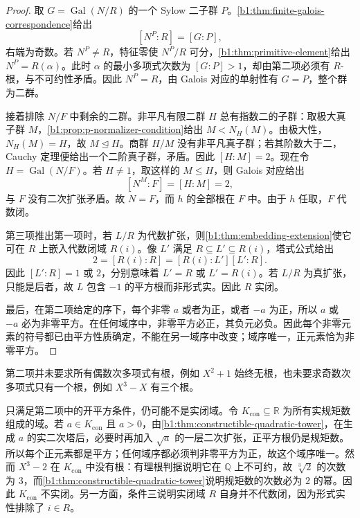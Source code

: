 \begin{proof}
	取 \(G=\operatorname{Gal}(N/R)\) 的一个 Sylow 二子群 \(P\)。\cref{b1:thm:finite-galois-correspondence}给出
	\[
		[N^P:R]=[G:P],
	\]
	右端为奇数。若 \(N^P\ne R\)，特征零使 \(N^P/R\) 可分，\cref{b1:thm:primitive-element}给出 \(N^P=R(\alpha)\)。此时 \(\alpha\) 的最小多项式次数为 \([G:P]>1\)，却由第二项必须有 \(R\)-根，与不可约性矛盾。因此 \(N^P=R\)，由 Galois 对应的单射性有 \(G=P\)，整个群为二群。

	接着排除 \(N/F\) 中剩余的二群。非平凡有限二群 \(H\) 总有指数二的子群：取极大真子群 \(M\)，\cref{b1:prop:p-normalizer-condition}给出 \(M<N_H(M)\)。由极大性，\(N_H(M)=H\)，故 \(M\trianglelefteq H\)。商群 \(H/M\) 没有非平凡真子群；若其阶数大于二，Cauchy 定理便给出一个二阶真子群，矛盾。因此 \([H:M]=2\)。现在令 \(H=\operatorname{Gal}(N/F)\)。若 \(H\ne1\)，取这样的 \(M\le H\)，则 Galois 对应给出
	\[
		[N^M:F]=[H:M]=2,
	\]
	与 \(F\) 没有二次扩张矛盾。故 \(N=F\)，而 \(h\) 的全部根在 \(F\) 中。由于 \(h\) 任取，\(F\) 代数闭。

	第三项推出第一项时，若 \(L/R\) 为代数扩张，则\cref{b1:thm:embedding-extension}使它可在 \(R\) 上嵌入代数闭域 \(R(i)\)。像 \(L'\) 满足 \(R\subseteq L'\subseteq R(i)\)，塔式公式给出
	\[
		2=[R(i):R]=[R(i):L'][L':R].
	\]
	因此 \([L':R]=1\) 或 \(2\)，分别意味着 \(L'=R\) 或 \(L'=R(i)\)。若 \(L/R\) 为真扩张，只能是后者，故 \(L\) 包含 \(-1\) 的平方根而非形式实。因此 \(R\) 实闭。

	最后，在第二项给定的序下，每个非零 \(a\) 或者为正，或者 \(-a\) 为正，所以 \(a\) 或 \(-a\) 必为非零平方。在任何域序中，非零平方必正，其负元必负。因此每个非零元素的符号都已由平方性质确定，不能在另一域序中改变；域序唯一，正元素恰为非零平方。
\end{proof}

第二项并未要求所有偶数次多项式有根，例如 \(X^2+1\) 始终无根，也未要求奇数次多项式只有一个根，例如 \(X^3-X\) 有三个根。

\ProseParagraphBreak
只满足第二项中的开平方条件，仍可能不是实闭域。令 \(K_{\mathrm{con}}\subseteq\mathbb R\) 为所有实规矩数组成的域。若 \(a\in K_{\mathrm{con}}\) 且 \(a>0\)，由\cref{b1:thm:constructible-quadratic-tower}，在生成 \(a\) 的实二次塔后，必要时再加入 \(\sqrt a\) 的一层二次扩张，正平方根仍是规矩数。所以每个正元素都是平方；任何域序都必须判非零平方为正，故这个域序唯一。然而 \(X^3-2\) 在 \(K_{\mathrm{con}}\) 中没有根：有理根判据说明它在 \(\mathbb Q\) 上不可约，故 \(\sqrt[3]2\) 的次数为 \(3\)，而\cref{b1:thm:constructible-quadratic-tower}说明规矩数的次数必为 \(2\) 的幂。因此 \(K_{\mathrm{con}}\) 不实闭。另一方面，条件三说明实闭域 \(R\) 自身并不代数闭，因为形式实性排除了 \(i\in R\)。

